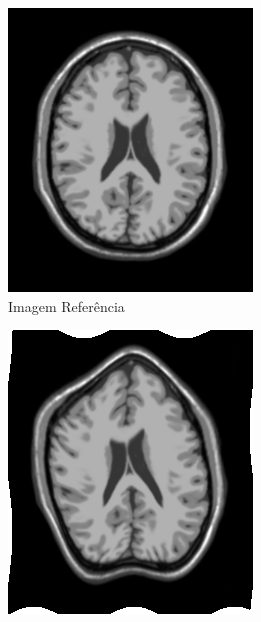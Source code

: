 \documentclass[]{spie}  %
\begin{document}
\begin{figure}[h]
	\centering
	\begin{subfigure}[t]{0.16\textwidth}
	  \includegraphics[width=\textwidth]{../images/screen.png}
	  \caption{Imagem Referência}
	  \label{fig:ref-image}
	\end{subfigure}
	\begin{subfigure}[t]{0.16\textwidth}
	  \includegraphics[width=\textwidth]{../images/movingImageSin.png}

\end{subfigure}
\end{figure}
\end{document}

